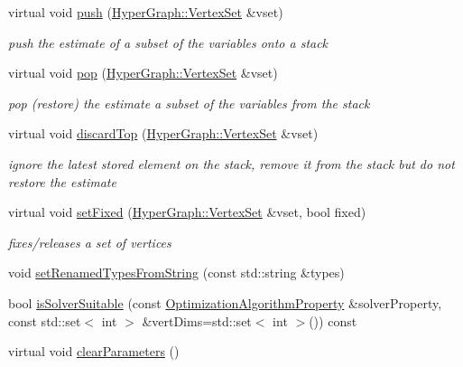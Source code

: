 \begin{DoxyCompactItemize}
virtual void \hyperlink{structg2o_1_1OptimizableGraph_a1d65a6854936147a92f7ba664302993e}{push} (\hyperlink{classg2o_1_1HyperGraph_a703938cdb4bb636860eed55a2489d70c}{Hyper\+Graph\+::\+Vertex\+Set} \&vset)
\begin{DoxyCompactList}\small\item\em push the estimate of a subset of the variables onto a stack \end{DoxyCompactList}\item 
virtual void \hyperlink{structg2o_1_1OptimizableGraph_a83425dbe755d22877ba692e93e04a6af}{pop} (\hyperlink{classg2o_1_1HyperGraph_a703938cdb4bb636860eed55a2489d70c}{Hyper\+Graph\+::\+Vertex\+Set} \&vset)
\begin{DoxyCompactList}\small\item\em pop (restore) the estimate a subset of the variables from the stack \end{DoxyCompactList}\item 
virtual void \hyperlink{structg2o_1_1OptimizableGraph_a74cbd91a3e05c1f497b4675b0e70113a}{discard\+Top} (\hyperlink{classg2o_1_1HyperGraph_a703938cdb4bb636860eed55a2489d70c}{Hyper\+Graph\+::\+Vertex\+Set} \&vset)
\begin{DoxyCompactList}\small\item\em ignore the latest stored element on the stack, remove it from the stack but do not restore the estimate \end{DoxyCompactList}\item 
virtual void \hyperlink{structg2o_1_1OptimizableGraph_a07514f6186d19b6d893a771c0bb6abf9}{set\+Fixed} (\hyperlink{classg2o_1_1HyperGraph_a703938cdb4bb636860eed55a2489d70c}{Hyper\+Graph\+::\+Vertex\+Set} \&vset, bool fixed)
\begin{DoxyCompactList}\small\item\em fixes/releases a set of vertices \end{DoxyCompactList}\item 
void \hyperlink{structg2o_1_1OptimizableGraph_afaa77a4624619237563fe94cfd7b76fd}{set\+Renamed\+Types\+From\+String} (const std\+::string \&types)
\item 
bool \hyperlink{structg2o_1_1OptimizableGraph_a4a3a8c7ffa964d2ab27ccdfdaca6a0cc}{is\+Solver\+Suitable} (const \hyperlink{structg2o_1_1OptimizationAlgorithmProperty}{Optimization\+Algorithm\+Property} \&solver\+Property, const std\+::set$<$ int $>$ \&vert\+Dims=std\+::set$<$ int $>$()) const 
\item 
virtual void \hyperlink{structg2o_1_1OptimizableGraph_a15171b6d335115858e2e86dcf576ba78}{clear\+Parameters} ()

\end{DoxyCompactItemize}
